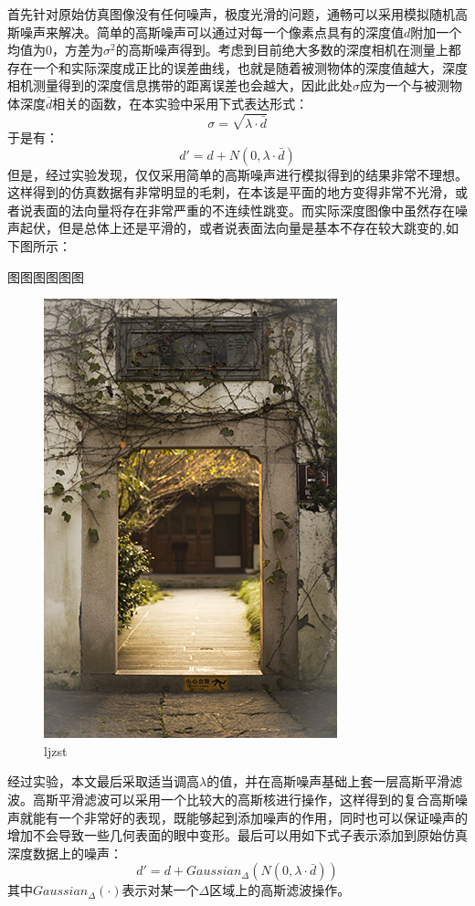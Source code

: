 首先针对原始仿真图像没有任何噪声，极度光滑的问题，通畅可以采用模拟随机高斯噪声来解决。简单的高斯噪声可以通过对每一个像素点具有的深度值$d$附加一个均值为$0$，方差为$\sigma ^2$的高斯噪声得到。考虑到目前绝大多数的深度相机在测量上都存在一个和实际深度成正比的误差曲线，也就是随着被测物体的深度值越大，深度相机测量得到的深度信息携带的距离误差也会越大，因此此处$\sigma$应为一个与被测物体深度$\bar{d}$相关的函数，在本实验中采用下式表达形式：
\begin{equation}
	\sigma = \sqrt{\lambda \cdot \bar{d}}
\end{equation}
于是有：
\begin{equation}
	d'=d+N(0, \lambda \cdot \bar{d})
\end{equation}
但是，经过实验发现，仅仅采用简单的高斯噪声进行模拟得到的结果非常不理想。这样得到的仿真数据有非常明显的毛刺，在本该是平面的地方变得非常不光滑，或者说表面的法向量将存在非常严重的不连续性跳变。而实际深度图像中虽然存在噪声起伏，但是总体上还是平滑的，或者说表面法向量是基本不存在较大跳变的,如下图所示：

图图图图图图
\begin{figure}[htb]
	\centering 
	\includegraphics[scale=1.0]{./Pictures/test.jpg} 
	\caption{ljzst} 
\end{figure}

经过实验，本文最后采取适当调高$\lambda$的值，并在高斯噪声基础上套一层高斯平滑滤波。高斯平滑滤波可以采用一个比较大的高斯核进行操作，这样得到的复合高斯噪声就能有一个非常好的表现，既能够起到添加噪声的作用，同时也可以保证噪声的增加不会导致一些几何表面的眼中变形。最后可以用如下式子表示添加到原始仿真深度数据上的噪声：
\begin{equation}
	d'=d+Gaussian_{\Delta}(N(0, \lambda \cdot \bar{d}))
\end{equation}
其中$Gaussian_{\Delta}(\cdot)$表示对某一个$\Delta$区域上的高斯滤波操作。

